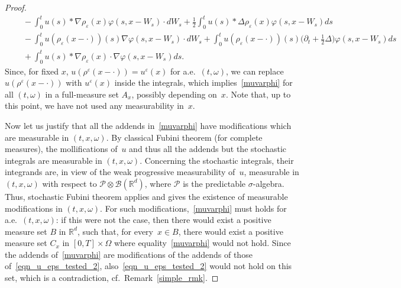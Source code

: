 \documentclass[a4paper,10pt]{article}
\newcommand\1{\mathbbm{1}}
\newcommand{\mr}{\mathbb{R}}
\newcommand{\mc}{\mathcal}
\newcommand{\eps}{\varepsilon}
\numberwithin{equation}{section}
\begin{document}
\begin{proof}
\begin{align}
 & \quad -\int^t_0 u(s)*\nabla\rho_\eps(x)\varphi(s,x-W_s)\cdot d W_s +\frac12 \int^t_0 u(s)*\Delta\rho_\eps(x)\varphi(s,x-W_s) ds \nonumber \\
 & \quad - \int^t_0 u(\rho_\eps(x-\cdot))(s)\nabla\varphi(s,x-W_s)\cdot d W_s 
 + \int^t_0 u(\rho_\eps(x-\cdot))(s) \big(\partial_t+\frac12\Delta\big)\varphi(s,x-W_s) d s \nonumber \\
 & \quad +\int^t_0 u(s)*\nabla\rho_\eps(x)\cdot\nabla\varphi(s,x-W_s) ds. \nonumber
\end{align}
Since, for fixed $x$, $u(\rho^\eps(x-\cdot))=u^\eps(x)$ for a.e.~$(t,\omega)$, we can replace $u(\rho^\eps(x-\cdot))$ with $u^\eps(x)$ inside the integrals, which implies~\eqref{muvarphi} for all $(t,\omega)$ in a full-measure set $A_x$, possibly depending on~$x$. Note that, up to this point, we have not used any measurability in~$x$.

Now let us justify that all the addends in~\eqref{muvarphi} have modifications which are measurable in $(t,x,\omega)$. By classical Fubini theorem (for complete measures), the mollifications of~$u$ and thus all the addends but the stochastic integrals are measurable in $(t,x,\omega)$. Concerning the stochastic integrals, their integrands are, in view of the weak progressive measurability of~$u$, measurable in $(t,x,\omega)$ with respect to $\mc{P}\otimes\mc{B}(\mr^d)$, where $\mc{P}$ is the predictable $\sigma$-algebra. Thus, stochastic Fubini theorem applies and gives the existence of measurable modifications in $(t,x,\omega)$. For such modifications,~\eqref{muvarphi} must holds for a.e.~$(t,x,\omega)$: if this were not the case, then there would exist a positive measure set $B$ in $\mr^d$, such that, for every~$x \in B$, there would exist a positive measure set $C_x$ in $[0,T]\times\Omega$ where equality~\ref{muvarphi} would not hold. Since the addends of~\eqref{muvarphi} are modifications of the addends of those of~\eqref{eqn_u_eps_tested_2}, also~\eqref{eqn_u_eps_tested_2} would not hold on this set, which is a contradiction, cf.~Remark~\ref{simple_rmk}.


\end{proof}
\end{document}
